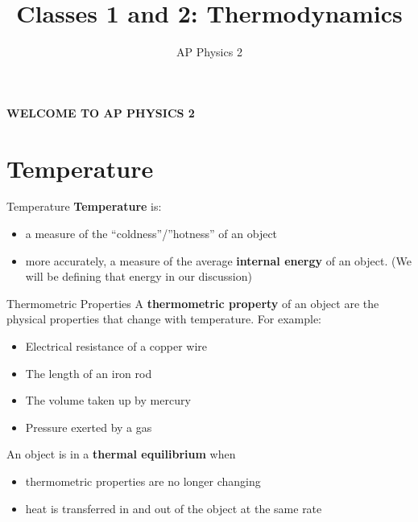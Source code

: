 \documentclass[12pt,aspectratio=169,dvipsnames]{beamer}
\title{Classes 1 and 2: Thermodynamics}
\subtitle{AP Physics 2}
\begin{document}
\begin{frame}
  \maketitle
\end{frame}

\begin{frame}
  \centering
  {\LARGE\textbf{WELCOME TO AP PHYSICS 2}}
\end{frame}



\section{Temperature}

\begin{frame}{Temperature}
  \textbf{Temperature} is:
  \begin{itemize}
  \item a measure of the ``coldness''/''hotness'' of an object
  \item more accurately, a measure of the average
    \textbf{internal energy} of an object. (We will be defining that energy
    in our discussion)
  \end{itemize}
\end{frame}



\begin{frame}{Thermometric Properties}
  A \textbf{thermometric property} of an object are the physical properties
  that change with temperature. For example:
  \begin{itemize}
  \item Electrical resistance of a copper wire
  \item The length of an iron rod
  \item The volume taken up by mercury
  \item Pressure exerted by a gas
  \end{itemize}

  \vspace{.2in}An object is in a \textbf{thermal equilibrium} when
  \begin{itemize}
  \item thermometric properties are no longer changing
  \item heat is transferred in and out of the object at the same rate
  \end{itemize}
\end{frame}
\end{document}
